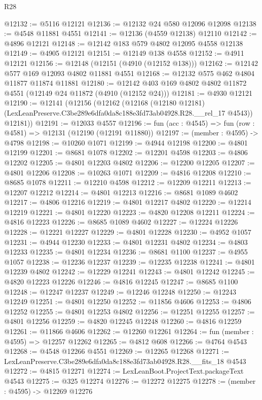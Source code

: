 \begin{lexlean}{R28}
\begin{coremodule}
@12132 := @5116 @12121
@12136 := @12132 @24 @580 @12096 @12098
@12138 := @4548 @11881 @4551
@12141 := @12136 (@4559 @12138) @12110
@12142 := @4896 @12121
@12148 := @12142 @183 @579 @4802 @12095 @4558 @12138
@12149 := @4905 @12121
@12151 := @12149 @138 @4558
@12152 := @4911 @12121
@12156 := @12148 (@12151 (@4910 (@12152 @138)))
@12162 := @12142 @577 @169 @12093 @4802 @11881 @4551
@12168 := @12132 @575 @462 @4804 @11877 @11874 @11881
@12180 := @12142 @403 @169 @4802 @4802 @11872 @4551 (@12149 @24 @11872 (@4910 (@12152 @24)))
@12181 := @4930 @12121
@12190 := @12141
    (@12156
      (@12162
        (@12168
          (@12180 @12181)
          (LexLeanPreserve.C3be289e6dfa0da8c188e3fd73ab04928.R28.__rel_17 @4543))
        @12181))
@12191 := @12033 @4557
@12196 := fun (acc : @4545) => fun (row : @4581) => @12131 (@12190 (@12191 @11880))
@12197 := (member : @4595) -> @4798
@12198 := @10260 @1071
@12199 := @4944 @12198
@12200 := @4801 @12199
@12201 := @8681 @1078
@12202 := @12201 @4598
@12203 := @4806 @12202
@12205 := @4801 @12203 @4802
@12206 := @12200 @12205
@12207 := @4801 @12206
@12208 := @10263 @1071
@12209 := @4816 @12208
@12210 := @8685 @1078
@12211 := @12210 @4598
@12212 := @12209 @12211
@12213 := @12207 @12212
@12214 := @4801 @12213
@12216 := @8681 @1089 @4602
@12217 := @4806 @12216
@12219 := @4801 @12217 @4802
@12220 := @12214 @12219
@12221 := @4801 @12220
@12223 := @4820 @12208 @12211
@12224 := @4816 @12223
@12226 := @8685 @1089 @4602
@12227 := @12224 @12226
@12228 := @12221 @12227
@12229 := @4801 @12228
@12230 := @4952 @1057
@12231 := @4944 @12230
@12233 := @4801 @12231 @4802
@12234 := @4803 @12233
@12235 := @4801 @12234
@12236 := @8681 @1100
@12237 := @4955 @1057
@12238 := @12236 @12237
@12239 := @12235 @12238
@12241 := @4801 @12239 @4802
@12242 := @12229 @12241
@12243 := @4801 @12242
@12245 := @4820 @12223 @12226
@12246 := @4816 @12245
@12247 := @8685 @1100
@12248 := @12247 @12237
@12249 := @12246 @12248
@12250 := @12243 @12249
@12251 := @4801 @12250
@12252 := @11856 @4606
@12253 := @4806 @12252
@12255 := @4801 @12253 @4802
@12256 := @12251 @12255
@12257 := @4801 @12256
@12259 := @4820 @12245 @12248
@12260 := @4816 @12259
@12261 := @11866 @4606
@12262 := @12260 @12261
@12264 := fun (member : @4595) => @12257 @12262
@12265 := @4812 @608
@12266 := @4764 @4543
@12268 := @4548 @12266 @4551
@12269 := @12265 @12268
@12271 := LexLeanPreserve.C3be289e6dfa0da8c188e3fd73ab04928.R28.__fits_18 @4543
@12272 := @4815 @12271
@12274 := LexLeanBoot.ProjectText.packageText @4543
@12275 := @325 @12274
@12276 := @12272 @12275
@12278 := (member : @4595) -> @12269 @12276

\end{coremodule}
\end{lexlean}
